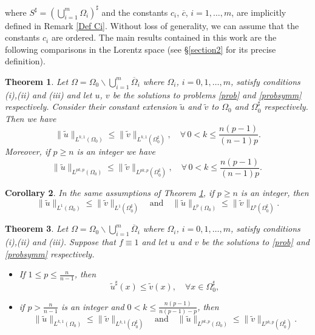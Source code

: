\documentclass[12pt]{article}
\theoremstyle{definition}
\theoremstyle{plain}
\newtheorem{teorema}{Theorem}[section]
\newtheorem{corollario}[teorema]{Corollary}
\theoremstyle{definition}
\begin{document}
where $S^\sharp=\left(\bigcup_{i=1}^{m}\Omega_i \right)^\sharp$ and the constants $c_i$, $\overline{c}$, $i=1,\dots,m$, are implicitly defined in Remark \ref{Def Ci}. Without loss of generality, we can assume that the constants $c_i$ are ordered.
The main results contained in this work are the following comparisons in the Lorentz space (see \S\ref{section2} for its precise definition).
\begin{teorema}\label{mainteor}
    Let $\Omega=\Omega_0\backslash\bigcup_{i=1}^m\overline{\Omega}_i$ where $\Omega_i$, $i=0,1,\dots,m$, satisfy conditions (i),(ii) and (iii) and let $u$, $v$ be the solutions to problems \eqref{prob} and \eqref{probsymm} respectively. Consider their constant extension $\tilde u$ and $\tilde v$ to $\Omega_0$ and $\Omega_0^\sharp$ respectively. Then we have
    \begin{equation*}
        \|\tilde u\|_{L^{k,1}(\Omega_0)}\leq\|\tilde v\|_{L^{k,1}(\Omega_0^\sharp)},\quad \forall\,0<k\leq \frac{n(p-1)}{(n-1)p}.
    \end{equation*}
    Moreover, if $p\geq n$ is an integer we have
    \begin{equation*}
        \|\tilde u\|_{L^{pk,p}(\Omega_0)}\leq\|\tilde v\|_{L^{pk,p}(\Omega_0^\sharp)},\quad \forall\,0<k\leq \frac{n(p-1)}{(n-1)p}.\
    \end{equation*}
\end{teorema}
\begin{corollario}\label{BM}
    In the same assumptions of Theorem \ref{mainteor}, if $p\geq n$ is an integer, then
    \begin{equation*}
        \|\tilde u\|_{L^1(\Omega_0)}\leq \|\tilde v\|_{L^1(\Omega_0^\sharp)}\quad \text{and}\quad \|\tilde u\|_{L^p(\Omega_0)}\leq \|\tilde v\|_{L^p(\Omega_0^\sharp)}.
    \end{equation*}
\end{corollario}
\begin{teorema}\label{mainteo2}
    Let $\Omega=\Omega_0\backslash\bigcup_{i=1}^m\overline{\Omega}_i$ where $\Omega_i$, $i=0,1,\dots,m$, satisfy conditions (i),(ii) and (iii).
    Suppose that $f\equiv1$ and let $u$ and $v$ be the solutions to \eqref{prob} and \eqref{probsymm} respectively.
    \begin{itemize}
        \item [(i)] If $1\leq p\leq \frac{n}{n-1}$, then
        \begin{equation*}
            \tilde u^\sharp(x)\leq \tilde v(x),\quad \forall x\in\Omega_0^\sharp,
        \end{equation*}
        \item [(ii)] if $p>\frac{n}{n-1}$ is an integer and $0<k\leq \frac{n(p-1)}{n(p-1)-p}$, then
        \begin{equation*}
            \|\tilde u\|_{L^{k,1}(\Omega_0)}\leq \|\tilde v\|_{L^{k,1}(\Omega_0^\sharp)}\quad \text{and}\quad \|\tilde u\|_{L^{pk,p}(\Omega_0)}\leq \|\tilde v\|_{L^{pk,p}(\Omega_0^\sharp)}.
        \end{equation*}
    \end{itemize}
\end{teorema}
\end{document}
